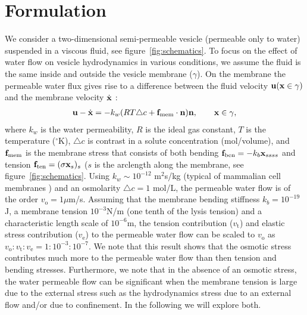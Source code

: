 \documentclass[9pt,twocolumn,twoside,lineno]{pnas-new}
\begin{document}
\section*{Formulation}
We consider a two-dimensional semi-permeable vesicle (permeable only to water) suspended in a viscous fluid, see figure~\ref{fig:schematics}.
To focus on the effect of water flow on vesicle hydrodynamics in various conditions, we assume the fluid is the same inside and outside the vesicle membrane ($\gamma$).
On the membrane the permeable water flux gives rise to a difference between the fluid velocity ${\bf u}({\bf x}\in \gamma)$
and the membrane velocity $\dot{\bf x}$ \cite{yao-mor2017}:
\begin{align}
  \label{eqn:vesicleFlux}
  \mathbf{u} - \dot{\mathbf{x}} = - k_w (R T \triangle c + \mathbf{f}_\mathrm{mem} \cdot \mathbf{n}) \mathbf{n}, \qquad
  \mathbf{x} \in \gamma,
\end{align}
where $k_w$ is the water permeability, $R$ is the ideal gas constant, $T$ is the temperature ($^{\circ}$K), $\triangle c$ is contrast in a solute concentration (mol/volume),
and $\mathbf{f}_\mathrm{mem}$ is the membrane stress that consists of both bending $ \mathbf{f}_\mathrm{ben}= -k_b \mathbf{x}_{ssss}$ and tension $\mathbf{f}_\mathrm{ten}=(\sigma \mathbf{x}_s)_s$ ($s$
is the arclength along the membrane, see figure~\ref{fig:schematics}. Using $k_w\sim 10^{-12}$ m$^2$s/kg (typical of mammalian cell membranes \cite{LiMoriSun2015_PRL}) and an osmolarity $\triangle c = 1$ mol/L, the permeable water flow is of the order $v_\mathrm{o}=1 \mu$m/s. Assuming that the membrane bending stiffness $k_b = 10^{-19}$J, a membrane tension $10^{-3}$N/m (one tenth of the lysis tension) and a characteristic length scale of $10^{-6}$m, the tension contribution ($v_\mathrm{t}$) and elastic stress contribution 
($v_\mathrm{e}$) to the permeable water flow can be scaled to $v_\mathrm{o}$ as $v_\mathrm{o}:v_\mathrm{t}:v_\mathrm{e}=1:10^{-3}:10^{-7}$. We note that this result shows that the osmotic stress contributes much more to the permeable water flow than then tension and bending stresses. Furthermore, we note that in the absence of an osmotic stress, the water permeable flow can be significant when the membrane tension is large due to the external stress such as the hydrodynamics stress due to an external flow and/or due to confinement.
In the following we will explore both.


\end{document}

